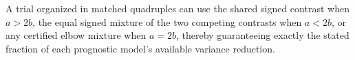 A trial organized in matched quadruples can use the shared signed contrast when \(a>2b\), the equal signed mixture of the two competing contrasts when \(a<2b\), or any certified elbow mixture when \(a=2b\), thereby guaranteeing exactly the stated fraction of each prognostic model's available variance reduction.